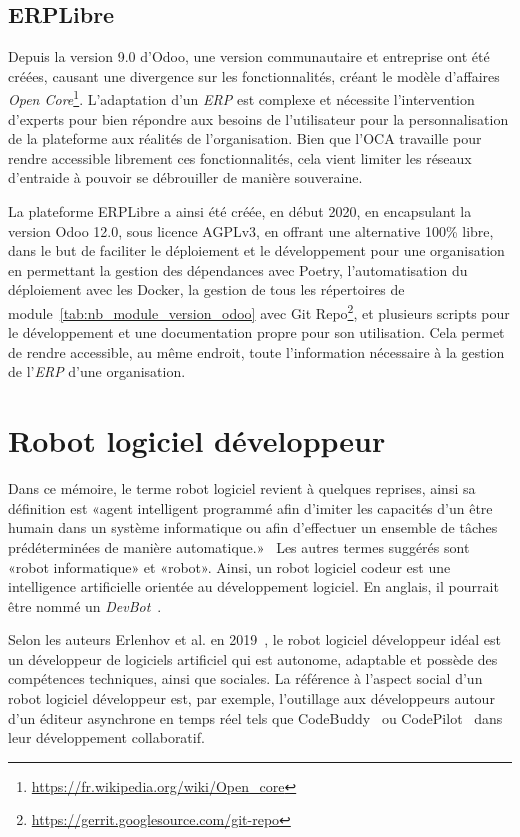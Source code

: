 \subsection{ERPLibre}

Depuis la version 9.0 d'Odoo, une version communautaire et entreprise ont été créées, causant une divergence sur les fonctionnalités, créant le modèle d'affaires \textit{Open Core}\footnote{\url{https://fr.wikipedia.org/wiki/Open_core}}. L'adaptation d'un \textit{ERP} est complexe et nécessite l'intervention d'experts pour bien répondre aux besoins de l'utilisateur pour la personnalisation de la plateforme aux réalités de l'organisation. Bien que l'OCA travaille pour rendre accessible librement ces fonctionnalités, cela vient limiter les réseaux d'entraide à pouvoir se débrouiller de manière souveraine.

La plateforme ERPLibre a ainsi été créée, en début 2020, en encapsulant la version Odoo 12.0, sous licence AGPLv3, en offrant une alternative 100\% libre, dans le but de faciliter le déploiement et le développement pour une organisation en permettant la gestion des dépendances avec Poetry, l'automatisation du déploiement avec les Docker, la gestion de tous les répertoires de module~\ref{tab:nb_module_version_odoo} avec Git Repo\footnote{\url{https://gerrit.googlesource.com/git-repo}}, et plusieurs scripts pour le développement et une documentation propre pour son utilisation. Cela permet de rendre accessible, au même endroit, toute l'information nécessaire à la gestion de l'\textit{ERP} d'une organisation.

\section{Robot logiciel développeur}\label{robot_logiciel_developpeur_revue}

Dans ce mémoire, le terme robot logiciel revient à quelques reprises, ainsi sa définition est «agent intelligent programmé afin d'imiter les capacités d'un être humain dans un système informatique ou afin d'effectuer un ensemble de tâches prédéterminées de manière automatique.»~\cite{robot_logiciel_oqlf_2018} Les autres termes suggérés sont «robot informatique» et «robot». Ainsi, un robot logiciel codeur est une intelligence artificielle orientée au développement logiciel. En anglais, il pourrait être nommé un \textit{DevBot}~\cite{8823643}.

Selon les auteurs Erlenhov et al. en 2019~\cite{8823643}, le robot logiciel développeur idéal est un développeur de logiciels artificiel qui est autonome, adaptable et possède des compétences techniques, ainsi que sociales. La référence à l'aspect social d'un robot logiciel développeur est, par exemple, l'outillage aux développeurs autour d'un éditeur asynchrone en temps réel tels que CodeBuddy~\cite{10.1145/3287324.3293750} ou CodePilot~\cite{10.5555/1030453.1030540} dans leur développement collaboratif. 

